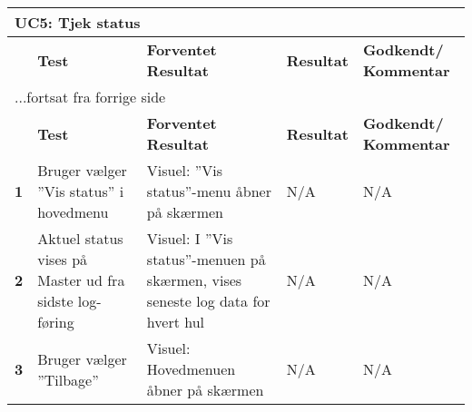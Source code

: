 \begin{center}
\begin{longtable}{|p{}|p{}|p{}|p{}|p{}|} %
\hline
\multicolumn{5}{|l|}{\textbf{UC5: Tjek status}} \\ \hline
\multicolumn{1}{|c|}{} &
\textbf{Test} &
\textbf{Forventet \newline Resultat} &
\textbf{Resultat} &
\textbf{Godkendt/ \newline Kommentar} \\ \hline 
\endfirsthead

\multicolumn{5}{l}{...fortsat fra forrige side} \\ \hline 
\multicolumn{1}{|c|}{} &
\textbf{Test} &
\textbf{Forventet \newline Resultat} &
\textbf{Resultat} &
\textbf{Godkendt/ \newline Kommentar} \\ \hline 
\endhead

\textbf{1}	&Bruger vælger ''Vis status'' i hovedmenu
			&Visuel: ''Vis status''-menu åbner på skærmen
			&N/A
			&N/A \\ \hline 
			
\textbf{2}	&Aktuel status vises på Master ud fra sidste log-føring
			&Visuel: I ''Vis status''-menuen på skærmen, vises seneste log data for hvert hul
			&N/A
			&N/A \\ \hline 

\textbf{3}	&Bruger vælger ''Tilbage''
			&Visuel: Hovedmenuen åbner på skærmen
			&N/A
			&N/A \\ \hline 
			
\end{longtable}
	\label{ATUC7} 
\end{center}
